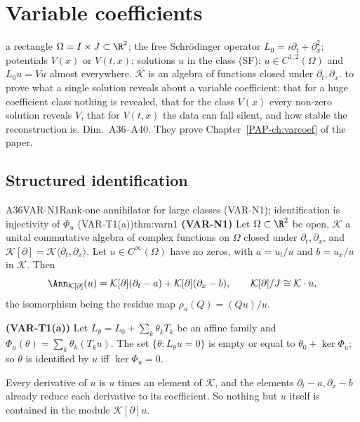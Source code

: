 \chapter[Variable coefficients]{Variable coefficients}\label{ch:cIII2}
\chapterbrief
{a rectangle $\Omega=I\times J\subset\R^2$; the free Schr\"odinger operator $L_0=i\partial_t+\partial_x^2$; potentials $V(x)$ or $V(t,x)$; solutions $u$ in the class (SF): $u\in C^{1,2}(\Omega)$ and $L_0u=Vu$ almost everywhere. $\mathcal K$ is an algebra of functions closed under $\partial_t,\partial_x$.}
{to prove what a single solution reveals about a variable coefficient: that for a huge coefficient class nothing is revealed, that for the class $V(x)$ every non-zero solution reveals $V$, that for $V(t,x)$ the data can fall silent, and how stable the reconstruction is.}
{Dim.~A36--A40. They prove Chapter~\ref{PAP-ch:varcoef} of the paper.}

\section{Structured identification}

\begin{dimcard}{A36}{VAR-N1}{Rank-one annihilator for large classes (VAR-N1); identification is injectivity of $\Phi_u$ (VAR-T1(a))}{\proved}{thm:varn1}
\textbf{(VAR-N1)} Let $\Omega\subset\R^2$ be open, $\mathcal K$ a unital commutative algebra of complex functions on $\Omega$ closed under $\partial_t,\partial_x$, and $\mathcal K[\partial]=\mathcal K\langle\partial_t,\partial_x\rangle$. Let $u\in C^\infty(\Omega)$ have no zeros, with $a=u_t/u$ and $b=u_x/u$ in $\mathcal K$. Then
\[
\Ann_{\mathcal K[\partial]}(u)=\mathcal K[\partial](\partial_t-a)+\mathcal K[\partial](\partial_x-b),\qquad \mathcal K[\partial]/J\cong\mathcal K\cdot u ,
\]
the isomorphism being the residue map $\rho_u(Q)=(Qu)/u$.

\textbf{(VAR-T1(a))} Let $L_\theta=L_0+\sum_k\theta_kT_k$ be an affine family and $\Phi_u(\theta)=\sum_k\theta_k(T_ku)$. The set $\{\theta:L_\theta u=0\}$ is empty or equal to $\theta_0+\ker\Phi_u$; so $\theta$ is identified by $u$ iff $\ker\Phi_u=0$.
\end{dimcard}

\begin{proofidea}
Every derivative of $u$ is $u$ times an element of $\mathcal K$, and the elements $\partial_t-a,\partial_x-b$ already reduce each derivative to its coefficient. So nothing but $u$ itself is contained in the module $\mathcal K[\partial]u$.
\end{proofidea}

